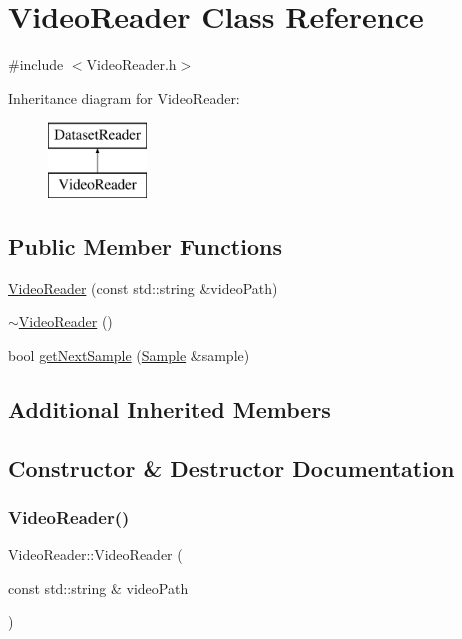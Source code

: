 \hypertarget{class_video_reader}{}\section{Video\+Reader Class Reference}
\label{class_video_reader}


{\ttfamily \#include $<$Video\+Reader.\+h$>$}

Inheritance diagram for Video\+Reader\+:\begin{figure}[H]
\begin{center}
\leavevmode
\includegraphics[height=2.000000cm]{class_video_reader}
\end{center}
\end{figure}
\subsection*{Public Member Functions}
\begin{DoxyCompactItemize}
\item 
\hyperlink{class_video_reader_ac9bbfd49c9205f8cc431ca4f4f8bb77a}{Video\+Reader} (const std\+::string \&video\+Path)
\item 
\hyperlink{class_video_reader_af865d4d939b87f3acc3d738c50ae6575}{$\sim$\+Video\+Reader} ()
\item 
bool \hyperlink{class_video_reader_ae2b1921c337b9e2543616017dbd551a7}{get\+Next\+Sample} (\hyperlink{struct_sample}{Sample} \&sample)
\end{DoxyCompactItemize}
\subsection*{Additional Inherited Members}


\subsection{Constructor \& Destructor Documentation}
\mbox{\label{class_video_reader_ac9bbfd49c9205f8cc431ca4f4f8bb77a}} 
\subsubsection{\texorpdfstring{Video\+Reader()}{VideoReader()}}
{\footnotesize\ttfamily Video\+Reader\+::\+Video\+Reader (\begin{DoxyParamCaption}\item[{const std\+::string \&}]{video\+Path }\end{DoxyParamCaption})}

